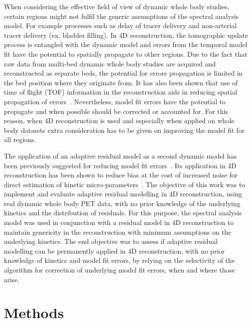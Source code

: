 When considering the effective field of view of dynamic whole body studies, certain regions might not fulfil the generic assumptions of the spectral analysis model. For example processes such as delay of tracer delivery and non-arterial tracer delivery (ex. bladder filling).
In 4D reconstruction, the tomographic update process is entangled with the dynamic model and errors from the temporal model fit have the potential to spatially propagate to other regions. Due to the fact that raw data from multi-bed dynamic whole body studies are acquired and reconstructed as separate beds, the potential for errors propagation is limited in the bed position where they originate from. It has also been shown that use of time of flight (TOF) information in the reconstruction aids in reducing spatial propagation of errors~\cite{Kotasidis2016a}. Nevertheless, model fit errors have the potential to propagate and when possible should be corrected or accounted for. For this reason, when 4D reconstruction is used and especially when applied on whole body datasets extra consideration has to be given on improving the model fit for all regions.

The application of an adaptive residual model as a second dynamic model has been previously suggested for reducing model fit errors~\cite{Matthews2012}. Its application in 4D reconstruction has been shown to reduce bias at the cost of increased noise for direct estimation of kinetic micro-parameters~\cite{Kotasidis2014c}.
The objective of this work was to implement and evaluate adaptive residual modelling in 4D reconstruction, using real dynamic whole body  PET data, with no prior knowledge of the underlying kinetics and the distribution of residuals. For this purpose, the spectral analysis model was used in conjunction with a residual model in 4D reconstruction to maintain genericity in the reconstruction with minimum assumptions on the underlying kinetics. 
The end objective was to assess if adaptive residual modelling can be permanently applied in 4D reconstruction, with no prior knowledge of kinetics and model fit errors, by relying on the selectivity of the algorithm for correction of underlying model fit errors, when and where those arise. 

\section{Methods}
